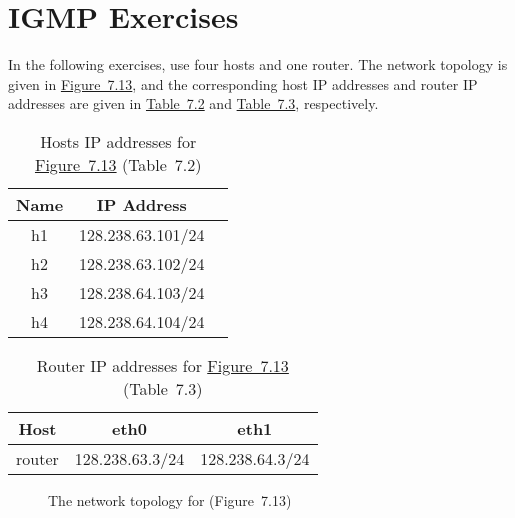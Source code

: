 \documentclass{../UTNetLab}
\begin{document}
\part{IGMP Exercises}\label{sec:igmp}
In the following exercises, use four hosts and one router.
The network topology is given in \hyperref[fig:7.13]{Figure~7.13}, and the corresponding host IP addresses and router IP addresses are given in \hyperref[tab:7.2]{Table~7.2} and \hyperref[tab:7.3]{Table~7.3}, respectively.

\begin{table}[H]
    \caption{Hosts IP addresses for \hyperref[fig:7.13]{Figure~7.13} (Table~7.2)}
    \label{tab:7.2}
    \centering
    \begin{tabular}{ *3c }
        \hline \hline
        Name & IP Address        \\
        \hline
        h1   & 128.238.63.101/24 \\
        h2   & 128.238.63.102/24 \\
        h3   & 128.238.64.103/24 \\
        h4   & 128.238.64.104/24 \\
        \hline \hline
    \end{tabular}
\end{table}

\begin{table}[H]
    \caption{Router IP addresses for \hyperref[fig:7.13]{Figure~7.13} (Table~7.3)}
    \label{tab:7.3}
    \centering
    \begin{tabular}{ *3c }
        \hline \hline
        Host   & eth0            & eth1            \\
        \hline
        router & 128.238.63.3/24 & 128.238.64.3/24 \\
        \hline \hline
    \end{tabular}
\end{table}

\begin{figure}[H]
    \centering
    \caption{The network topology for  (Figure~7.13)}
    \label{fig:7.13}
\end{figure}
\end{document}
